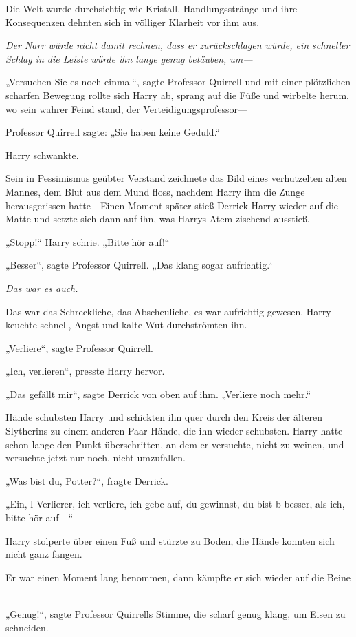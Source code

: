 {Die Welt wurde durchsichtig wie Kristall. Handlungsstränge und ihre Konsequenzen dehnten sich in völliger Klarheit vor ihm aus.

\emph{Der Narr würde nicht damit rechnen, dass er zurückschlagen würde, ein schneller Schlag in die Leiste würde ihn lange genug betäuben, um—}

„Versuchen Sie es noch einmal“, sagte Professor Quirrell und mit einer plötzlichen scharfen Bewegung rollte sich Harry ab, sprang auf die Füße und wirbelte herum, wo sein wahrer Feind stand, der Verteidigungsprofessor—

Professor Quirrell sagte: „Sie haben keine Geduld.“

Harry schwankte.

Sein in Pessimismus geübter Verstand zeichnete das Bild eines verhutzelten alten Mannes, dem Blut aus dem Mund floss, nachdem Harry ihm die Zunge herausgerissen hatte - Einen Moment später stieß Derrick Harry wieder auf die Matte und setzte sich dann auf ihn, was Harrys Atem zischend ausstieß.

„Stopp!“ Harry schrie. „Bitte hör auf!“

„Besser“, sagte Professor Quirrell. „Das klang sogar aufrichtig.“

\emph{Das war es auch.}

Das war das Schreckliche, das Abscheuliche, es war aufrichtig gewesen. Harry keuchte schnell, Angst und kalte Wut durchströmten ihn.

„Verliere“, sagte Professor Quirrell.

„Ich, verlieren“, presste Harry hervor.

„Das gefällt mir“, sagte Derrick von oben auf ihm. „Verliere noch mehr.“

Hände schubsten Harry und schickten ihn quer durch den Kreis der älteren Slytherins zu einem anderen Paar Hände, die ihn wieder schubsten. Harry hatte schon lange den Punkt überschritten, an dem er versuchte, nicht zu weinen, und versuchte jetzt nur noch, nicht umzufallen.

„Was bist du, Potter?“, fragte Derrick.

„Ein, l-Verlierer, ich verliere, ich gebe auf, du gewinnst, du bist b-besser, als ich, bitte hör auf—“

Harry stolperte über einen Fuß und stürzte zu Boden, die Hände konnten sich nicht ganz fangen.

Er war einen Moment lang benommen, dann kämpfte er sich wieder auf die Beine—

„Genug!“, sagte Professor Quirrells Stimme, die scharf genug klang, um Eisen zu schneiden.

}
